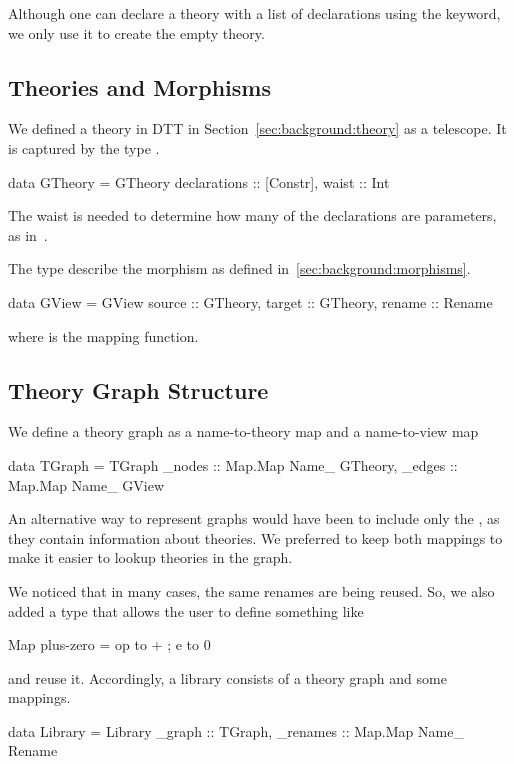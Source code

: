 Although one can declare a theory with a list of declarations using the  keyword, we only use it to create the empty theory. 


\subsection{Theories and Morphisms}
\label{subsec:theoriesMorphisms}
We defined a theory in DTT in Section~\ref{sec:background:theory} as a telescope.  It is captured by the type . 
\begin{hscode}
data GTheory = GTheory {
  declarations :: [Constr],
  waist        :: Int     }
\end{hscode}
The waist is needed to determine how many of the declarations are parameters, as in~\cite{alhassy2019}. 

The type  describe the morphism as defined in~\ref{sec:background:morphisms}. 
\begin{hscode}
data GView  = GView {
  source  :: GTheory,
  target  :: GTheory,
  rename :: Rename }  
\end{hscode}
where  is the mapping function. 

\subsection{Theory Graph Structure}
\label{subsec:graph}
We define a theory graph as a name-to-theory map and a name-to-view map 
\begin{hscode}
data TGraph = TGraph { 
  _nodes :: Map.Map Name_ GTheory,
  _edges :: Map.Map Name_ GView } 
\end{hscode}
An alternative way to represent graphs would have been to include only the , as they contain information about theories. We preferred to keep both mappings to make it easier to lookup theories in the graph. 

We noticed that in many cases, the same renames are being reused. So, we also added a  type that allows the user to define something like 
\begin{hscode}
Map plus-zero = {op to + ; e to 0}
\end{hscode}
and reuse it. Accordingly, a library consists of a theory graph and some mappings. 
\begin{hscode}
data Library = Library {
  _graph   :: TGraph,
  _renames :: Map.Map Name_ Rename }
\end{hscode}

